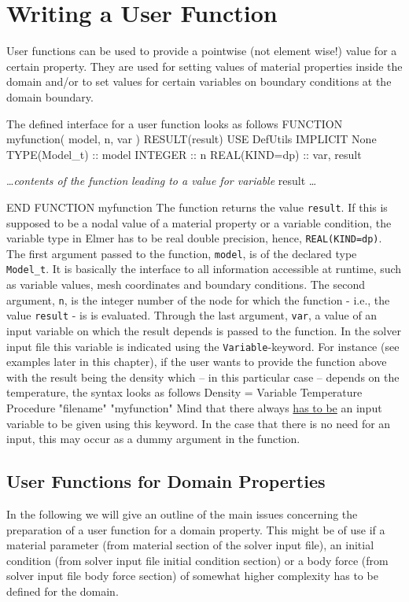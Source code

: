 \section{Writing a User Function\label{programming:UDF}}
User functions can be used to provide a pointwise (not element wise!) value for a certain property. They are used for setting values of material properties inside the domain and/or to set values for certain variables on boundary conditions at the domain boundary.

The defined interface for a user function looks as follows
\ttbegin
FUNCTION myfunction( model, n, var ) RESULT(result)
  USE DefUtils
  IMPLICIT None
  TYPE(Model_t) :: model
  INTEGER :: n
  REAL(KIND=dp) :: var, result

  \ldots \textit{contents of the function}
  \textit{leading to a value for variable} result \ldots

END FUNCTION myfunction
\ttend
The function returns the value \texttt{result}. If this is supposed to be a nodal value of a material property or a variable condition, the variable type in Elmer has to be real double precision, hence, \texttt{REAL(KIND=dp)}.\newline
The first argument passed to the function, \texttt{model}, is of the declared type \texttt{Model\_t}. It is basically the interface to all information accessible at runtime, such as variable values, mesh coordinates and boundary conditions.\newline
The second argument, \texttt{n}, is the integer number of the node for which the function  - i.e., the value \texttt{result} -  is is evaluated.
Through the last argument, \texttt{var}, a value of an input variable  on which the result depends is passed to the function. In the solver input file this variable is indicated using the \texttt{Variable}-keyword. For instance (see examples later in this chapter), if the user wants to provide the function above with the result being the density which -- in this particular case -- depends on the temperature, the syntax looks as follows
\ttbegin
Density  = Variable Temperature
  Procedure "filename" "myfunction"
\ttend
Mind that there always \underline{has to be} an input variable to be given using this keyword. In the case that there is no need for an input, this may occur as a dummy argument in the function.
\subsection{User Functions for Domain Properties\label{programming:UDF_bulk}} 
In the following we will give an outline of the main issues concerning the preparation of a user function for a domain property. This might be of use if a material parameter (from material section of the solver input file), an initial condition (from solver input file initial condition section) or a body force (from solver input file body force section) of somewhat higher complexity has to be defined for the domain.

